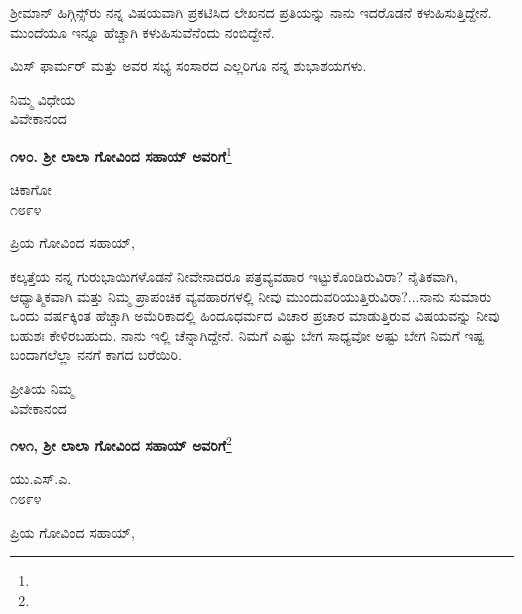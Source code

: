 ಶ‍್ರೀಮಾನ್ ಹಿಗ್ಗಿನ್ಸ್‌ರು ನನ್ನ ವಿಷಯವಾಗಿ ಪ್ರಕಟಿಸಿದ ಲೇಖನದ ಪ್ರತಿಯನ್ನು ನಾನು ಇದರೊಡನೆ ಕಳುಹಿಸುತ್ತಿದ್ದೇನೆ. ಮುಂದೆಯೂ ಇನ್ನೂ ಹೆಚ್ಚಾಗಿ ಕಳುಹಿಸುವೆನೆಂದು ನಂಬಿದ್ದೇನೆ.

ಮಿಸ್‌ ಫಾರ್ಮರ್ ಮತ್ತು ಅವರ ಸಭ್ಯ ಸಂಸಾರದ ಎಲ್ಲರಿಗೂ ನನ್ನ ಶುಭಾಶಯಗಳು.

\vspace{-0.45cm}

{\flushright
ನಿಮ್ಮ ವಿಧೇಯ\\ವಿವೇಕಾನಂದ\par}

\begin{center}
\textbf{೧೪೦. ಶ‍್ರೀ ಲಾಲಾ ಗೋವಿಂದ ಸಹಾಯ್ ಅವರಿಗೆ}\footnote{}
\end{center}

\vspace{-0.73cm}

\begin{flushright}
ಚಿಕಾಗೋ\\೧೮೯೪
\end{flushright}

\vspace{-0.5cm}

\noindent
ಪ್ರಿಯ ಗೋವಿಂದ ಸಹಾಯ್,

ಕಲ್ಕತ್ತೆಯ ನನ್ನ ಗುರುಭಾಯಿಗಳೊಡನೆ ನೀವೇನಾದರೂ ಪತ್ರವ್ಯವಹಾರ ಇಟ್ಟುಕೊಂಡಿರುವಿರಾ? ನೈತಿಕವಾಗಿ, ಆಧ್ಯಾತ್ಮಿಕವಾಗಿ ಮತ್ತು ನಿಮ್ಮ ಪ್ರಾಪಂಚಿಕ ವ್ಯವಹಾರಗಳಲ್ಲಿ ನೀವು ಮುಂದುವರಿಯುತ್ತಿರುವಿರಾ?...ನಾನು ಸುಮಾರು ಒಂದು ವರ್ಷಕ್ಕಿಂತ ಹೆಚ್ಚಾಗಿ ಅಮೆರಿಕಾದಲ್ಲಿ ಹಿಂದೂಧರ್ಮದ ವಿಚಾರ ಪ್ರಚಾರ ಮಾಡುತ್ತಿರುವ ವಿಷಯವನ್ನು ನೀವು ಬಹುಶಃ ಕೇಳಿರಬಹುದು. ನಾನು ಇಲ್ಲಿ ಚೆನ್ನಾಗಿದ್ದೇನೆ. ನಿಮಗೆ ಎಷ್ಟು ಬೇಗ ಸಾಧ್ಯವೋ ಅಷ್ಟು ಬೇಗ ನಿಮಗೆ ಇಷ್ಟ ಬಂದಾಗಲೆಲ್ಲಾ ನನಗೆ ಕಾಗದ ಬರೆಯಿರಿ.

\vspace{-0.5cm}

{\flushright
ಪ್ರೀತಿಯ ನಿಮ್ಮ\\ವಿವೇಕಾನಂದ\par}

\begin{center}
\textbf{೧೪೧, ಶ‍್ರೀ ಲಾಲಾ ಗೋವಿಂದ ಸಹಾಯ್ ಅವರಿಗೆ}\footnote{}
\end{center}

\vspace{-0.75cm}

\begin{flushright}
ಯು.ಎಸ್.ಎ.\\೧೮೯೪
\end{flushright}

\vspace{-0.5cm}

\noindent
ಪ್ರಿಯ ಗೋವಿಂದ ಸಹಾಯ್,

